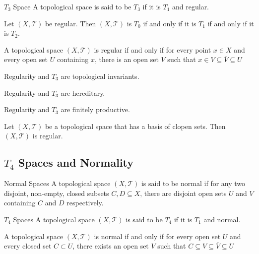 \documentclass[a4paper]{article}
\begin{document}
\begin{defn}{$T_3$ Space}{} A topological space is said to be $T_3$ if it is $T_1$ and regular. 
\end{defn}

\begin{prp}{}{} Let $(X,\mathcal{T})$ be regular. Then $(X,\mathcal{T})$ is $T_0$ if and only if it is $T_1$ if and only if it is $T_2$. 
\end{prp}

\begin{prp}{}{} A topological space $(X,\mathcal{T})$ is regular if and only if for every point $x\in X$ and every open set $U$ containing $x$, there is an open set $V$ such that $x\in V\subseteq\overline{V}\subseteq U$
\end{prp}

\begin{prp}{}{} Regularity and $T_3$ are topological invariants. 
\end{prp}

\begin{prp}{}{} Regularity and $T_3$ are hereditary. 
\end{prp}

\begin{prp}{}{} Regularity and $T_3$ are finitely productive. 
\end{prp}

\begin{prp}{}{} Let $(X,\mathcal{T})$ be a topological space that has a basis of clopen sets. Then $(X,\mathcal{T})$ is regular. 
\end{prp}

\subsection{$T_4$ Spaces and Normality}
\begin{defn}{Normal Spaces}{} A topological space $(X,\mathcal{T})$ is said to be normal if for any two disjoint, non-empty, closed subsets $C,D\subseteq X$, there are disjoint open sets $U$ and $V$ containing $C$ and $D$ respectively. 
\end{defn}

\begin{defn}{$T_4$ Spaces}{} A topological space $(X,\mathcal{T})$ is said to be $T_4$ if it is $T_1$ and normal. 
\end{defn}

\begin{prp}{}{}  A topological space $(X,\mathcal{T})$ is normal if and only if for every open set $U$ and every closed set $C\subset U$, there exists an open set $V$ such that $C\subseteq V\subseteq\overline{V}\subseteq U$
\end{prp}
\end{document}
